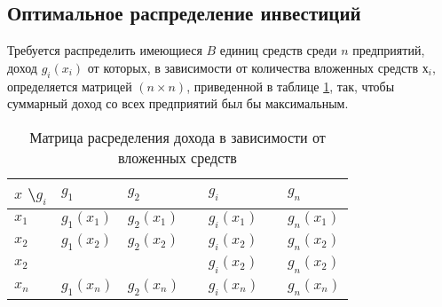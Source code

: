 \subsection{Оптимальное распределение инвестиций}

Требуется распределить имеющиеся $B$ единиц средств среди $n$ предприятий, доход $g_i(x_i)$ от которых, в зависимости от количества вложенных средств $х_i$, определяется матрицей $(n \times n)$, приведенной в таблице \ref{table:opt:initial:data}, так, чтобы суммарный доход со всех предприятий был бы максимальным.

\begin{table}[!ht]
  \label{table:opt:initial:data}
  \caption{Матрица расределения дохода в зависимости от вложенных средств}
  \centering
  \begin{tabularx}{\linewidth}{ |X|X|X|X|X|X|X| }
	\hline
	$x$ \textbackslash $g_i$ & $g_1$ & $g_2$ & \textellipsis & $g_i$ & \textellipsis & $g_n$ \\
	\hline
	$x_1$ & $g_1(x_1)$ & $g_2(x_1)$ & \textellipsis & $g_i(x_1)$ & \textellipsis & $g_n(x_1)$ \\
	\hline
	$x_2$ & $g_1(x_2)$ & $g_2(x_2)$ & \textellipsis & $g_i(x_2)$ & \textellipsis & $g_n(x_2)$ \\
	\hline
	$x_2$ & \textellipsis & \textellipsis & \textellipsis & $g_i(x_2)$ & \textellipsis & $g_n(x_2)$ \\
	\hline
	$x_n$ & $g_1(x_n)$ & $g_2(x_n)$ & \textellipsis & $g_i(x_n)$ & \textellipsis & $g_n(x_n)$ \\
	\hline
  \end{tabularx}
\end{table}